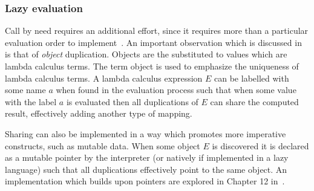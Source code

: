 \documentclass[11pt,oneside,a4paper]{report}
\begin{document}
\subsubsection{Lazy evaluation}
Call by need requires an additional effort, since it requires more than a particular evaluation order to implement~\cite{levy1988sharing}.
An important observation which is discussed in~\cite{levy1988sharing} is that of \textit{object} duplication.
Objects are the substituted to values which are lambda calculus terms.
The term object is used to emphasize the uniqueness of lambda calculus terms.
A lambda calculus expression $E$ can be labelled with some name $a$ when found in the evaluation process such that when some value with the label $a$ is evaluated then all duplications of $E$ can share the computed result, effectively adding another type of mapping.
\begin{remark}
    Sharing can also be implemented in a way which promotes more imperative constructs, such as mutable data.
    When some object $E$ is discovered it is declared as a mutable pointer by the interpreter (or natively if implemented in a lazy language) such that all duplications effectively point to the same object.
    An implementation which builds upon pointers are explored in Chapter 12 in~\cite{peyton1987implementation}.
\end{remark}
\end{document}
